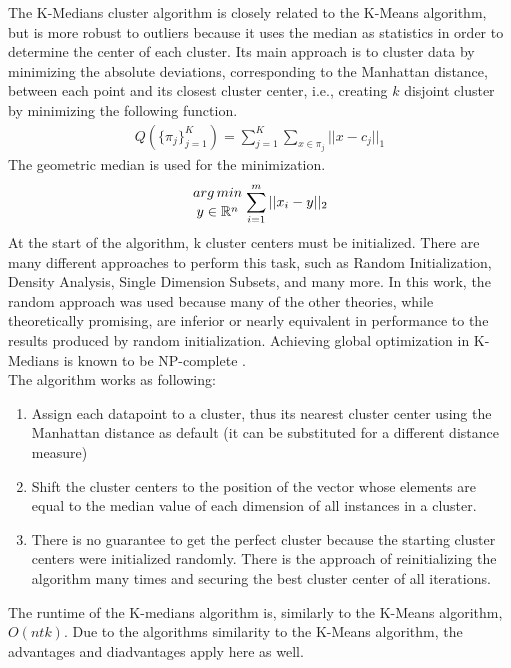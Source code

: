 The K-Medians cluster algorithm is closely related to the K-Means algorithm, but is more robust to outliers because it uses the median as statistics in order to determine the center of each cluster. Its main approach is to cluster data by minimizing the absolute deviations, corresponding to the Manhattan distance, between each point and its closest cluster center, i.e., creating $k$ disjoint cluster by minimizing the following function. \cite{kmed}
\begin{align}
    Q(\{\pi_j\}^K_{j=1}) = \sum_{j=1}^{K}\sum_{x \in \pi_j}||x-c_j||_1
\end{align}
The geometric median is used for the minimization.
\begin{align}
    {{arg\, min}\atop{y\in\mathbb{R}^n}} \sum_{i=1}^m ||x_i-y||_2
\end{align}
At the start of the algorithm, k cluster centers must be initialized. There are many different approaches to perform this task, such as Random Initialization, Density Analysis, Single Dimension Subsets, and many more. In this work, the random approach was used because many of the other theories, while theoretically promising, are inferior or nearly equivalent in performance to the results produced by random initialization. \cite{kmed} Achieving global optimization in K-Medians is known to be NP-complete \cite{kmed_time}.\\ 
The algorithm works as following:\cite{algo_kmed}
\begin{enumerate}
    \item Assign each datapoint to a cluster, thus its nearest cluster center using the Manhattan distance as default (it can be substituted for a different distance measure) 
    \item Shift the cluster centers to the position of the vector whose elements are equal to the median value of each dimension of all instances in a cluster.
    \item There is no guarantee to get the perfect cluster because the starting cluster centers were initialized randomly. There is the approach of reinitializing the algorithm many times and securing the best cluster center of all iterations.
\end{enumerate}
The runtime of the K-medians algorithm is, similarly to the K-Means algorithm, $O(ntk)$. Due to the algorithms similarity to the K-Means algorithm, the advantages and diadvantages apply here as well.\\
